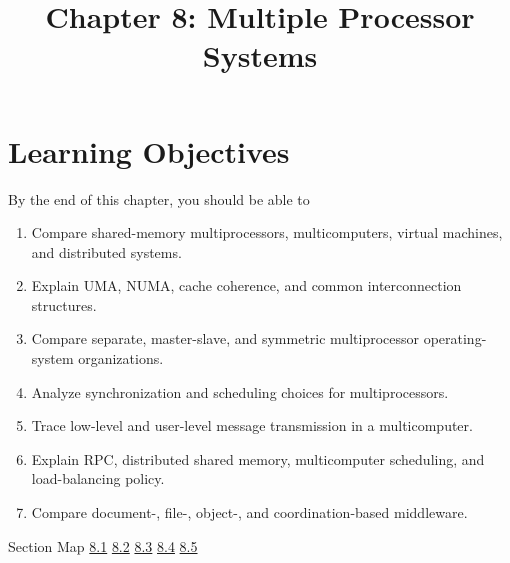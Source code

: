 \documentclass[10pt,letterpaper]{article}
\title{Chapter 8: Multiple Processor Systems}
\author{}
\date{}
\begin{document}
\maketitle
\section*{Learning Objectives}
\begin{studybox}{By the end of this chapter, you should be able to}
\begin{enumerate}
  \item Compare shared-memory multiprocessors, multicomputers, virtual machines, and distributed systems.
  \item Explain UMA, NUMA, cache coherence, and common interconnection structures.
  \item Compare separate, master-slave, and symmetric multiprocessor operating-system organizations.
  \item Analyze synchronization and scheduling choices for multiprocessors.
  \item Trace low-level and user-level message transmission in a multicomputer.
  \item Explain RPC, distributed shared memory, multicomputer scheduling, and load-balancing policy.
  \item Compare document-, file-, object-, and coordination-based middleware.
\end{enumerate}
\end{studybox}

\begin{studybox}{Section Map}
\hyperlink{sec-8-1}{8.1} \quad \hyperlink{sec-8-2}{8.2} \quad \hyperlink{sec-8-3}{8.3} \quad \hyperlink{sec-8-4}{8.4} \quad \hyperlink{sec-8-5}{8.5}
\end{studybox}
\end{document}
